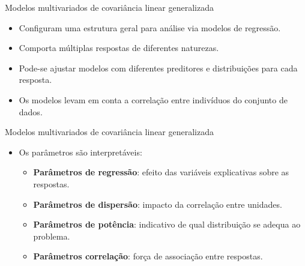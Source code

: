 \documentclass[
  ignorenonframetext,
  serif,
  professionalfont,
  usenames,
  dvipsnames,
  aspectratio = 169]{beamer}
\begin{document}
\begin{frame}{Modelos multivariados de covariância linear generalizada}
\protect\hypertarget{modelos-multivariados-de-covariuxe2ncia-linear-generalizada-1}{}
\begin{itemize}
   
   \itemsep 2ex
   
  \item Configuram uma estrutura geral para análise via modelos de regressão.
  
  \item Comporta múltiplas respostas de diferentes naturezas.
  
  \item Pode-se ajustar modelos com diferentes preditores e distribuições para cada resposta.
  
  \item Os modelos levam em conta a correlação entre indivíduos do conjunto de dados. 

\end{itemize}
\end{frame}

\begin{frame}{Modelos multivariados de covariância linear generalizada}
\protect\hypertarget{modelos-multivariados-de-covariuxe2ncia-linear-generalizada-2}{}
\begin{itemize}
   
   \itemsep 2ex
  
  \item Os parâmetros são interpretáveis:
  
    \begin{itemize}
    
    \itemsep 2ex
      
      \item \textbf{Parâmetros de regressão}: efeito das variáveis explicativas sobre as respostas.
      
      \item \textbf{Parâmetros de dispersão}: impacto da correlação entre unidades.
      
      \item \textbf{Parâmetros de potência}: indicativo de qual distribuição se adequa ao problema.
      
      \item \textbf{Parâmetros correlação}: força de associação entre respostas.
      
    \end{itemize}

\end{itemize}
\end{frame}
\end{document}
